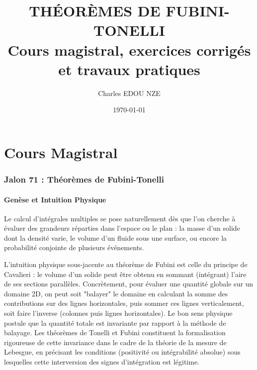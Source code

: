 \documentclass[11pt,a4paper]{article}
\title{\Huge THÉORÈMES DE FUBINI-TONELLI \\ \large Cours magistral, exercices corrigés et travaux pratiques}
\author{\Large Charles EDOU NZE}
\date{\today}
\begin{document}
\maketitle
\tableofcontents
\newpage

\part{Cours Magistral}

\begin{center}
\end{center}


\section{Jalon 71 : Théorèmes de Fubini-Tonelli}

\subsection{Genèse et Intuition Physique}

Le calcul d'intégrales multiples se pose naturellement dès que l'on cherche \`a évaluer des grandeurs réparties dans l'espace ou le plan : la masse d'un solide dont la densité varie, le volume d'un fluide sous une surface, ou encore la probabilité conjointe de plusieurs événements.

L'intuition physique sous-jacente au théorème de Fubini est celle du principe de Cavalieri : le volume d'un solide peut être obtenu en sommant (intégrant) l'aire de ses sections parallèles. Concrètement, pour évaluer une quantité globale sur un domaine 2D, on peut soit "balayer" le domaine en calculant la somme des contributions sur des lignes horizontales, puis sommer ces lignes verticalement, soit faire l'inverse (colonnes puis lignes horizontales). Le bon sens physique postule que la quantité totale est invariante par rapport \`a la méthode de balayage. Les théorèmes de Tonelli et Fubini constituent la formalisation rigoureuse de cette invariance dans le cadre de la théorie de la mesure de Lebesgue, en précisant les conditions (positivité ou intégrabilité absolue) sous lesquelles cette interversion des signes d'intégration est légitime.
\end{document}
